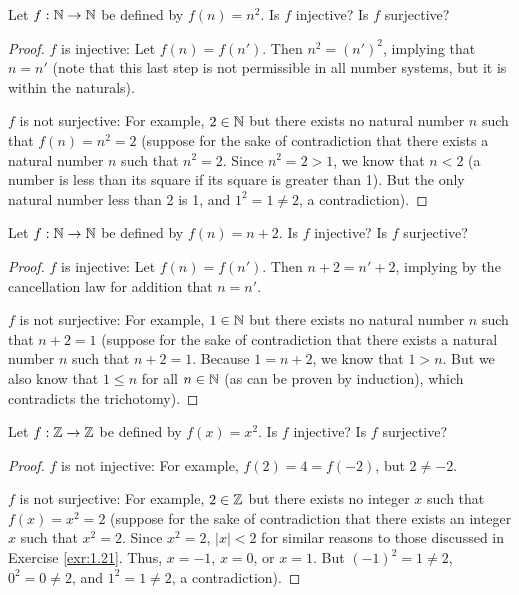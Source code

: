 \documentclass[../main.tex]{subfiles}
\begin{document}
\begin{exercise}\label{exr:1.21}
    Let $f:\mathbb{N}\to\mathbb{N}$ be defined by $f(n)=n^2$. Is $f$ injective? Is $f$ surjective?
    \begin{proof}
        $f$ is injective: Let $f(n)=f(n')$. Then $n^2=(n')^2$, implying that $n=n'$ (note that this last step is not permissible in all number systems, but it is within the naturals).\par
        $f$ is not surjective: For example, $2\in\mathbb{N}$ but there exists no natural number $n$ such that $f(n)=n^2=2$ (suppose for the sake of contradiction that there exists a natural number $n$ such that $n^2=2$. Since $n^2=2>1$, we know that $n<2$ (a number is less than its square if its square is greater than 1). But the only natural number less than 2 is 1, and $1^2=1\neq 2$, a contradiction).
    \end{proof}
\end{exercise}

\begin{exercise}\label{exr:1.22}
    Let $f:\mathbb{N}\to\mathbb{N}$ be defined by $f(n)=n+2$. Is $f$ injective? Is $f$ surjective?
    \begin{proof}
        $f$ is injective: Let $f(n)=f(n')$. Then $n+2=n'+2$, implying by the cancellation law for addition that $n=n'$.\par
        $f$ is not surjective: For example, $1\in\mathbb{N}$ but there exists no natural number $n$ such that $n+2=1$ (suppose for the sake of contradiction that there exists a natural number $n$ such that $n+2=1$. Because $1=n+2$, we know that $1>n$. But we also know that $1\leq n$ for all $n\in\mathbb{N}$ (as can be proven by induction), which contradicts the trichotomy).
    \end{proof}
\end{exercise}

\begin{exercise}\label{exr:1.23}
    Let $f:\mathbb{Z}\to\mathbb{Z}$ be defined by $f(x)=x^2$. Is $f$ injective? Is $f$ surjective?
    \begin{proof}
        $f$ is not injective: For example, $f(2)=4=f(-2)$, but $2\neq -2$.\par
        $f$ is not surjective: For example, $2\in\mathbb{Z}$ but there exists no integer $x$ such that $f(x)=x^2=2$ (suppose for the sake of contradiction that there exists an integer $x$ such that $x^2=2$. Since $x^2=2$, $|x|<2$ for similar reasons to those discussed in Exercise \ref{exr:1.21}. Thus, $x=-1$, $x=0$, or $x=1$. But $(-1)^2=1\neq 2$, $0^2=0\neq 2$, and $1^2=1\neq 2$, a contradiction).
    \end{proof}
\end{exercise}
\end{document}
